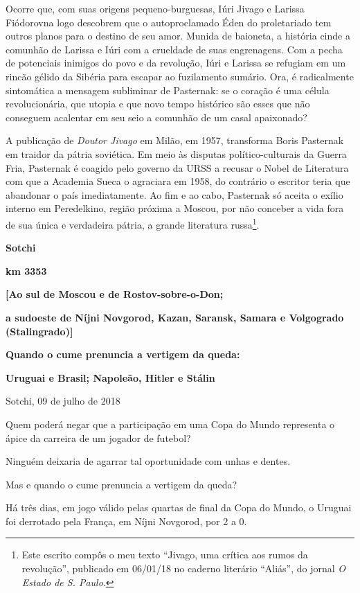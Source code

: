 Ocorre que, com suas origens pequeno-burguesas, Iúri Jivago e Larissa
Fiódorovna logo descobrem que o autoproclamado Éden do proletariado tem
outros planos para o destino de seu amor. Munida de baioneta, a história
cinde a comunhão de Larissa e Iúri com a crueldade de suas engrenagens.
Com a pecha de potenciais inimigos do povo e da revolução, Iúri e
Larissa se refugiam em um rincão gélido da Sibéria para escapar ao
fuzilamento sumário. Ora, é radicalmente sintomática a mensagem
subliminar de Pasternak: se o coração é uma célula revolucionária, que
utopia e que novo tempo histórico são esses que não conseguem acalentar
em seu seio a comunhão de um casal apaixonado?

A publicação de \emph{Doutor Jivago} em Milão, em 1957, transforma Boris
Pasternak em traidor da pátria soviética. Em meio às disputas
político-culturais da Guerra Fria, Pasternak é coagido pelo governo da
URSS a recusar o Nobel de Literatura com que a Academia Sueca o
agraciara em 1958, do contrário o escritor teria que abandonar o país
imediatamente. Ao fim e ao cabo, Pasternak só aceita o exílio interno em
Peredelkino, região próxima a Moscou, por não conceber a vida fora de
sua única e verdadeira pátria, a grande literatura russa\footnote{Este
  escrito compôs o meu texto ``Jivago, uma crítica aos rumos da
  revolução'', publicado em 06/01/18 no caderno literário ``Aliás'', do
  jornal \emph{O Estado de S. Paulo}.}.

\textbf{Sotchi}

\textbf{km 3353}

\textbf{{[}Ao sul de Moscou e de Rostov-sobre-o-Don;}

\textbf{a sudoeste de Níjni Novgorod, Kazan, Saransk, Samara e
Volgogrado (Stalingrado){]}}

\textbf{Quando o cume prenuncia a vertigem da queda:}

\textbf{Uruguai e Brasil; Napoleão, Hitler e Stálin}

Sotchi, 09 de julho de 2018

Quem poderá negar que a participação em uma Copa do Mundo representa o
ápice da carreira de um jogador de futebol?

Ninguém deixaria de agarrar tal oportunidade com unhas e dentes.

Mas e quando o cume prenuncia a vertigem da queda?

Há três dias, em jogo válido pelas quartas de final da Copa do Mundo, o
Uruguai foi derrotado pela França, em Níjni Novgorod, por 2 a 0.

